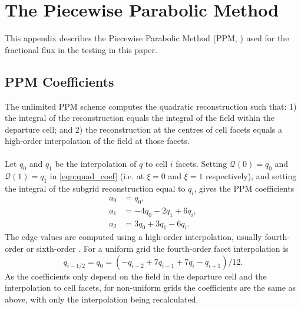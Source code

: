 \documentclass[11pt,a4paper]{article}
\begin{document}
\appendix

\section{The Piecewise Parabolic Method} \label{sec:ppm_appendix}

This appendix describes the Piecewise Parabolic Method (PPM, \citet{colella1984ppm}) used for the fractional flux in the testing in this paper.

\subsection{PPM Coefficients} \label{sec:ppm_recon}

The unlimited PPM scheme \citep{colella1984ppm} computes the quadratic reconstruction such that: 1) the integral of the reconstruction equals the integral of the field within the departure cell; and 2) the reconstruction at the centres of cell facets equals a high-order interpolation of the field at those facets. \\
\\
Let $q_0$ and $q_1$ be the interpolation of $q$ to cell $i$ facets. Setting $\mathcal{Q}(0)=q_0$ and $\mathcal{Q}(1) = q_1$ in \eqref{eqn:quad_coef} (i.e. at $\xi=0$ and $\xi=1$ respectively), and setting the integral of the subgrid reconstruction equal to $q_i$, gives the PPM coefficients
\begin{subequations}
\begin{align}
    a_0 &= q_0, \\
    a_1 &= -4 q_0 - 2 q_1 + 6 q_i, \\
    a_2 &= 3 q_0 + 3 q_1 - 6 q_i.
\end{align}
\end{subequations}
The edge values are computed using a high-order interpolation, usually fourth-order \citep{colella1984ppm} or sixth-order \citep{colella2008}.
For a uniform grid the fourth-order facet interpolation is
\begin{equation}
    q_{i-1/2} = q_0 = \left( -q_{i-2} + 7 q_{i-1} + 7 q_{i} - q_{i+1}\right)/12.
\end{equation}
As the coefficients only depend on the field in the departure cell and the interpolation to cell facets, for non-uniform grids the coefficients are the same as above, with only the interpolation being recalculated.  
\end{document}
